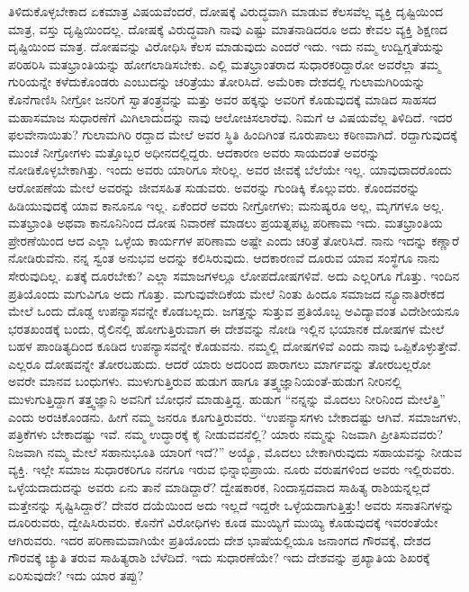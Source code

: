 ತಿಳಿದುಕೊಳ್ಳಬೇಕಾದ ಏಕಮಾತ್ರ ವಿಷಯವೆಂದರೆ, ದೋಷಕ್ಕೆ ವಿರುದ್ಧವಾಗಿ ಮಾಡುವ ಕೆಲಸವೆಲ್ಲ ವ್ಯಕ್ತಿ ದೃಷ್ಟಿಯಿಂದ ಮಾತ್ರ, ವಸ್ತು ದೃಷ್ಟಿಯಿಂದಲ್ಲ. ದೋಷಕ್ಕೆ ವಿರುದ್ಧವಾಗಿ ನಾವು ಎಷ್ಟು ಮಾತನಾಡಿದರೂ ಅದು ಕೇವಲ ವ್ಯಕ್ತಿ ಶಿಕ್ಷಣದ ದೃಷ್ಟಿಯಿಂದ ಮಾತ್ರ. ದೋಷವನ್ನು ವಿರೋಧಿಸಿ ಕೆಲಸ ಮಾಡುವುದು ಎಂದರೆ ಇದು. ಇದು ನಮ್ಮ ಉದ್ವಿಗ್ನತೆಯನ್ನು ಪರಿಹರಿಸಿ ಮತಭ್ರಾಂತಿಯನ್ನು ಹೋಗಲಾಡಿಸಬೇಕು. ಎಲ್ಲಿ ಮತಭ್ರಾಂತರಾದ ಸುಧಾರಕರಿದ್ದಾರೋ ಅವರೆಲ್ಲಾ ತಮ್ಮ ಗುರಿಯನ್ನೇ ಕಳೆದುಕೊಂಡರು ಎಂಬುದನ್ನು ಚರಿತ್ರೆಯು ತೋರಿಸಿದೆ. ಅಮೆರಿಕಾ ದೇಶದಲ್ಲಿ ಗುಲಾಮಗಿರಿಯನ್ನು ಕೊನೆಗಾಣಿಸಿ ನೀಗ್ರೋ ಜನರಿಗೆ ಸ್ವಾತಂತ್ರ್ಯವನ್ನು ಮತ್ತು ಅವರ ಹಕ್ಕನ್ನು ಅವರಿಗೆ ಕೊಡುವುದಕ್ಕೆ ಮಾಡಿದ ಸಾಹಸದ ಮಹಾ\-ಸಮಾಜ ಸುಧಾರಣೆಗೆ ಮಿಗಿಲಾದುದನ್ನು ನಾವು ಆಲೋಚಿಸಲಾರೆವು. ನಿಮಗೆ ಆ ವಿಷಯವೆಲ್ಲ ತಿಳಿದಿದೆ. ಇದರ ಫಲವೇನಾಯಿತು? ಗುಲಾಮಗಿರಿ ರದ್ದಾದ ಮೇಲೆ ಅವರ ಸ್ಥಿತಿ ಹಿಂದಿಗಿಂತ ನೂರುಪಾಲು ಕಠಿಣವಾಗಿದೆ. ರದ್ದಾಗುವುದಕ್ಕೆ ಮುಂಚೆ ನೀಗ್ರೋಗಳು ಮತ್ತೊಬ್ಬರ ಅಧೀನದಲ್ಲಿದ್ದರು. ಆದಕಾರಣ ಅವರು ಸಾಯದಂತೆ ಅವರನ್ನು ನೋಡಿಕೊಳ್ಳಬೇಕಾಗಿತ್ತು. ಇಂದು ಅವರು ಯಾರಿಗೂ ಸೇರಿಲ್ಲ. ಅವರ ಜೀವಕ್ಕೆ ಬೆಲೆಯೇ ಇಲ್ಲ. ಯಾವುದಾದರೊಂದು ಆರೋ\-ಪಣೆಯ ಮೇಲೆ ಅವರನ್ನು ಜೀವಸಹಿತ ಸುಡುವರು. ಅವರನ್ನು ಗುಂಡಿಕ್ಕಿ ಕೊಲ್ಲುವರು. ಕೊಂದವರನ್ನು ಹಿಡಿಯುವುದಕ್ಕೆ ಯಾವ ಕಾನೂನೂ ಇಲ್ಲ. ಏಕೆಂದರೆ ಅವರು ನೀಗ್ರೋಗಳು; ಮನುಷ್ಯರೂ ಅಲ್ಲ, ಮೃಗಗಳೂ ಅಲ್ಲ. ಮತಭ್ರಾಂತಿ ಅಥವಾ ಕಾನೂನಿನಿಂದ ದೋಷ ನಿವಾರಣೆ ಮಾಡಲು ಪ್ರಯತ್ನಪಟ್ಟ ಪರಿಣಾಮ ಇದು. ಮತಭ್ರಾಂತಿಯ ಪ್ರೇರಣೆಯಿಂದ ಆದ ಎಲ್ಲಾ ಒಳ್ಳೆಯ ಕಾರ್ಯಗಳ ಪರಿಣಾಮ ಅಷ್ಟೇ ಎಂದು ಚರಿತ್ರೆ ತೋರಿಸಿದೆ. ನಾನು ಇದನ್ನು ಕಣ್ಣಾರೆ ನೋಡಿರುವೆನು. ನನ್ನ ಸ್ವಂತ ಅನುಭವ ಅದನ್ನು ಕಲಿಸಿರುವುದು. ಆದಕಾರಣವೆ ದೂರುವ ಯಾವ ಸಂಸ್ಥೆಗೂ ನಾನು ಸೇರುವುದಿಲ್ಲ. ಏತಕ್ಕೆ ದೂರಬೇಕು? ಎಲ್ಲಾ ಸಮಾಜಗಳಲ್ಲೂ ಲೋಪದೋಷಗಳಿವೆ. ಅದು ಎಲ್ಲರಿಗೂ ಗೊತ್ತು. ಇಂದಿನ ಪ್ರತಿಯೊಂದು ಮಗುವಿಗೂ ಅದು ಗೊತ್ತು. ಮಗುವು\break ವೇದಿಕೆಯ ಮೇಲೆ ನಿಂತು ಹಿಂದೂ ಸಮಾಜದ ನ್ಯೂನಾತಿರೇಕದ ಮೇಲೆ ಒಂದು ದೊಡ್ಡ ಉಪನ್ಯಾಸವನ್ನೇ ಕೊಡಬಲ್ಲದು. ಜಗತ್ತನ್ನು ಸುತ್ತುವ ಪ್ರತಿಯೊಬ್ಬ ಅವಿದ್ಯಾವಂತ ವಿದೇಶೀಯನೂ ಭರತಖಂಡಕ್ಕೆ ಬಂದು, ರೈಲಿನಲ್ಲಿ ಹೋಗುತ್ತಿರುವಾಗ ಈ ದೇಶವನ್ನು ನೋಡಿ ಇಲ್ಲಿನ ಭಯಾನಕ ದೋಷಗಳ ಮೇಲೆ ಬಹಳ ಪಾಂಡಿತ್ಯದಿಂದ ಕೂಡಿದ ಉಪನ್ಯಾಸವನ್ನೇ ಕೊಡುವನು. ನಮ್ಮಲ್ಲಿ ದೋಷಗಳಿವೆ ಎಂದು ನಾವು ಒಪ್ಪಿಕೊಳ್ಳುತ್ತೇವೆ. ಎಲ್ಲರೂ ದೋಷವನ್ನೇ ತೋರಬಹುದು. ಆದರೆ ಯಾರು ಅದರಿಂದ ಪಾರಾಗಲು ಮಾರ್ಗವನ್ನು ತೋರಬಲ್ಲರೋ ಅವರೇ ಮಾನವ ಬಂಧುಗಳು. ಮುಳುಗುತ್ತಿರುವ ಹುಡುಗ ಹಾಗೂ ತತ್ತ್ವಜ್ಞಾನಿಯಂತೆ-ಹುಡುಗ ನೀರಿನಲ್ಲಿ ಮುಳುಗುತ್ತಿದ್ದಾಗ ತತ್ತ್ವಜ್ಞಾನಿ ಅವನಿಗೆ ಬೋಧನೆ ಮಾಡುತ್ತಿದ್ದ. ಹುಡುಗ “ನನ್ನನ್ನು ಮೊದಲು ನೀರಿನಿಂದ ಮೇಲೆತ್ತಿ” ಎಂದು ಅರಚಿಕೊಂಡನು. ಹೀಗೆ ನಮ್ಮ ಜನರೂ ಕೂಗುತ್ತಿರುವರು. “ಉಪನ್ಯಾಸಗಳು ಬೇಕಾದಷ್ಟು ಆಗಿವೆ. ಸಮಾಜಗಳು, ಪತ್ರಿಕೆಗಳು ಬೇಕಾದಷ್ಟು ಇವೆ. ನಮ್ಮ ಉದ್ಧಾರಕ್ಕೆ ಕೈ ನೀಡುವವನೆಲ್ಲಿ? ಯಾರು ನಮ್ಮನ್ನು ನಿಜವಾಗಿ ಪ್ರೀತಿಸುವವರು? ನಿಜವಾಗಿ ನಮ್ಮ ಮೇಲೆ ಸಹಾನುಭೂತಿ ಯಾರಿಗೆ ಇದೆ?” ಅಯ್ಯೊ, ಮೊದಲು ಬೇಕಾಗಿರುವುದು ಸಹಾಯವನ್ನು ನೀಡುವ ವ್ಯಕ್ತಿ. ಇಲ್ಲೇ ಸಮಾಜ ಸುಧಾರಕರಿಗೂ ನನಗೂ ಇರುವ ಭಿನ್ನಾಭಿಪ್ರಾಯ. ನೂರು ವರುಷಗಳಿಂದ ಅವರು ಇಲ್ಲಿರುವರು. ಒಳ್ಳೆಯದಾದುದನ್ನು ಅವರು ಏನು ತಾನೆ ಮಾಡಿದ್ದಾರೆ? ದ್ವೇಷಕಾರಕ, ನಿಂದಾಸ್ಪದವಾದ ಸಾಹಿತ್ಯ ರಾಶಿಯನ್ನಲ್ಲದೆ ಮತ್ತೇನನ್ನು ಸೃಷ್ಟಿಸಿದ್ದಾರೆ? ದೇವರ ದಯೆಯಿಂದ ಅದು ಇಲ್ಲದೆ ಇದ್ದರೇ ಒಳ್ಳೆಯದಾಗುತ್ತಿತ್ತು! ಅವರು ಸನಾತನಿಗಳನ್ನು ದೂರಿರುವರು, ದ್ವೇಷಿಸಿರುವರು. ಕೊನೆಗೆ ವಿರೋಧಿ\-ಗಳು ಕೂಡ ಮುಯ್ಯಿಗೆ ಮುಯ್ಯಿ ಕೊಡುವುದಕ್ಕೆ ಇವರಂತೆಯೇ ಆಗಿರುವರು. ಇದರ ಪರಿಣಾಮವಾಗಿಯೇ ಪ್ರತಿಯೊಂದು ದೇಶ ಭಾಷೆಯಲ್ಲಿಯೂ ಜನಾಂಗದ ಗೌರವಕ್ಕೆ, ದೇಶದ ಗೌರವಕ್ಕೆ ಚ್ಯುತಿ ತರುವ ಸಾಹಿತ್ಯರಾಶಿ ಬೆಳೆದಿದೆ. ಇದು ಸುಧಾರಣೆಯೇ? ಇದು ದೇಶವನ್ನು ಪ್ರಖ್ಯಾತಿಯ ಶಿಖರಕ್ಕೆ ಏರಿಸುವುದೇ? ಇದು ಯಾರ ತಪ್ಪು?

